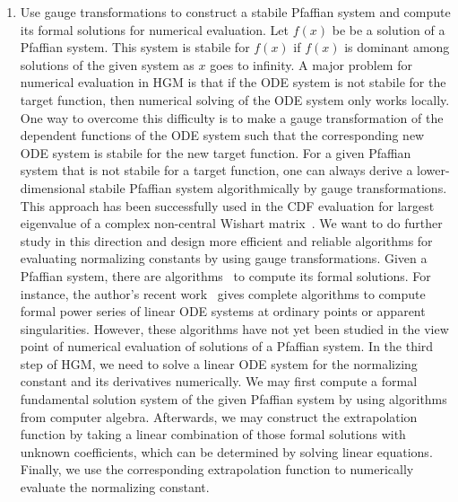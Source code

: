 \documentclass[10pt,a4paper]{article}
\begin{document}
\begin{enumerate}
\item Use gauge transformations to construct a stabile Pfaffian system and compute its formal solutions for numerical evaluation. Let $f(x)$ be be a solution of a Pfaffian system. This system is stabile for $f(x)$ if $f(x)$ is dominant among solutions of the given system as $x$ goes to infinity. A major problem for numerical evaluation in HGM is that if the ODE system is not stabile for the target function, then numerical solving of the ODE system only works locally. One way to overcome this difficulty is to make a gauge transformation of the dependent functions of the ODE system such that the corresponding new ODE system is stabile for the new target function. For a given Pfaffian system that is not stabile for a target function, one can always derive a lower-dimensional stabile Pfaffian system algorithmically by gauge transformations. This approach has been successfully used in the CDF evaluation for largest eigenvalue of a complex non-central Wishart matrix~\cite{Danufane2018}. We want to do further study in this direction and design more efficient and reliable algorithms for evaluating normalizing constants by using gauge transformations.  
  Given a Pfaffian system, there are algorithms~\cite{Moser1959, Barkatou07, Yi2017} to compute its formal solutions. For instance, the author’s recent work~\cite{Yi2017} gives complete algorithms to compute formal power series of linear ODE systems at ordinary points or apparent singularities. However, these algorithms have not yet been studied in the view point of numerical evaluation of solutions of a Pfaffian system. In the third step of HGM, we need to solve a linear ODE system for the normalizing constant and its derivatives numerically. We may first compute a formal fundamental solution system of the given Pfaffian system by using algorithms from computer algebra. Afterwards, we may construct the extrapolation function by taking a linear combination of those formal solutions with unknown coefficients, which can be determined by solving linear equations. Finally, we use the corresponding extrapolation function to numerically evaluate the normalizing constant. 
\end{enumerate}


\end{document}
